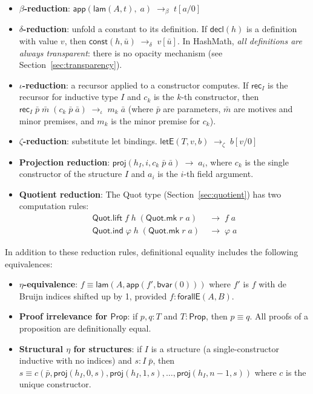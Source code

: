 \documentclass[11pt]{article}
\theoremstyle{definition}
\theoremstyle{plain}
\theoremstyle{remark}
\newcommand{\Prop}{\textsf{Prop}}
\newcommand{\bvar}{\textsf{bvar}}
\newcommand{\const}{\textsf{const}}
\newcommand{\app}{\textsf{app}}
\newcommand{\lam}{\textsf{lam}}
\newcommand{\forallE}{\textsf{forallE}}
\newcommand{\letE}{\textsf{letE}}
\newcommand{\proj}{\textsf{proj}}
\newcommand{\Quot}{\textsf{Quot}}
\begin{document}
\begin{itemize}[nosep]
  \item \textbf{$\beta$-reduction}: $\app(\lam(A, t),\; a) \;\longrightarrow_\beta\; t[a/0]$

  \item \textbf{$\delta$-reduction}: unfold a constant to its definition.
        If $\textsf{decl}(h)$ is a definition with value $v$, then $\const(h, \bar{u}) \;\longrightarrow_\delta\; v[\bar{u}]$.
        In HashMath, \emph{all definitions are always transparent}: there is no opacity mechanism (see Section~\ref{sec:transparency}).

  \item \textbf{$\iota$-reduction}: a recursor applied to a constructor computes.
        If $\textsf{rec}_I$ is the recursor for inductive type $I$ and $c_k$ is the $k$-th constructor,
        then $\textsf{rec}_I \; \bar{p} \; \bar{m} \; (c_k \; \bar{p} \; \bar{a}) \;\longrightarrow_\iota\; m_k \; \bar{a}$
        (where $\bar{p}$ are parameters, $\bar{m}$ are motives and minor premises, and $m_k$ is the minor premise for $c_k$).

  \item \textbf{$\zeta$-reduction}: substitute let bindings.
        $\letE(T, v, b) \;\longrightarrow_\zeta\; b[v/0]$

  \item \textbf{Projection reduction}: $\proj(h_I, i, c_k \; \bar{p} \; \bar{a}) \;\longrightarrow\; a_i$,
        where $c_k$ is the single constructor of the structure $I$ and $a_i$ is the $i$-th field argument.

  \item \textbf{Quotient reduction}: The Quot type (Section~\ref{sec:quotient}) has two computation rules:
        \begin{align*}
          \Quot.\textsf{lift}\; f\; h\; (\Quot.\textsf{mk}\; r\; a) &\;\longrightarrow\; f\; a \\
          \Quot.\textsf{ind}\; \varphi\; h\; (\Quot.\textsf{mk}\; r\; a) &\;\longrightarrow\; \varphi\; a
        \end{align*}
\end{itemize}

In addition to these reduction rules, definitional equality includes the following
equivalences:

\begin{itemize}[nosep]
  \item \textbf{$\eta$-equivalence}: $f \equiv \lam(A, \app(f', \bvar(0)))$ where $f'$ is $f$ with de Bruijn indices shifted up by 1, provided $f : \forallE(A, B)$.

  \item \textbf{Proof irrelevance for $\Prop$}: if $p, q : T$ and $T : \Prop$, then $p \equiv q$.
        All proofs of a proposition are definitionally equal.

  \item \textbf{Structural $\eta$ for structures}: if $I$ is a structure (a single-constructor inductive with no indices) and $s : I \; \bar{p}$, then
        $s \equiv c(\bar{p}, \proj(h_I, 0, s), \proj(h_I, 1, s), \ldots, \proj(h_I, n{-}1, s))$
        where $c$ is the unique constructor.
\end{itemize}
\end{document}
